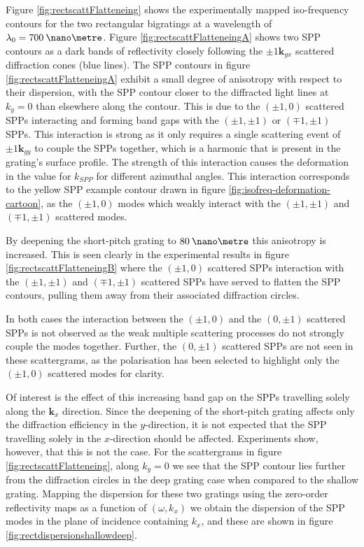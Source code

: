 Figure \ref{fig:rectscattFlatteneing} shows the experimentally mapped iso-frequency contours for the two rectangular bigratings at a wavelength of $\lambda_0=700\:\nano\metre$. Figure \ref{fig:rectscattFlatteneingA} shows two SPP contours as a dark bands of reflectivity closely following the $\pm 1\mathbf{k}_{gx}$ scattered diffraction cones (blue lines). The SPP contours in figure \ref{fig:rectscattFlatteneingA} exhibit a small degree of anisotropy with respect to their dispersion, with the SPP contour closer to the diffracted light lines at $k_y=0$ than elsewhere along the contour. This is due to the $(\pm 1,0)$ scattered SPPs interacting and forming band gaps with the $(\pm 1,\pm 1)$ or $(\mp 1,\pm 1)$ SPPs. This interaction is strong as it only requires a single scattering event of $\pm1\mathbf{k}_{gy}$ to couple the SPPs together, which is a harmonic that is present in the grating's surface profile. The strength of this interaction causes the deformation in the value for $k_{SPP}$ for different azimuthal angles. This interaction corresponds to the yellow SPP example contour drawn in figure \ref{fig:isofreq-deformation-cartoon}, as the $(\pm1,0)$ modes which weakly interact with the $(\pm 1,\pm 1)$ and $(\mp1,\pm1)$ scattered modes. 

By deepening the short-pitch grating to $80\:\nano\metre$ this anisotropy is increased. This is seen clearly in the experimental results in figure \ref{fig:rectscattFlatteneingB} where the $(\pm 1,0)$ scattered SPPs interaction with the $(\pm1,\pm 1)$ and $(\mp 1,\pm 1)$ scattered SPPs have served to flatten the SPP contours, pulling them away from their associated diffraction circles.

In both cases the interaction between the $(\pm 1,0)$ and the $(0,\pm1)$ scattered SPPs is not observed as the weak multiple scattering processes do not strongly couple the modes together. Further, the $(0,\pm 1)$ scattered SPPs are not seen in these scattergrams, as the polarisation has been selected to highlight only the $(\pm 1,0)$ scattered modes for clarity.

Of interest is the effect of this increasing band gap on the SPPs travelling solely along the $\mathbf{k}_x$ direction. Since the deepening of the short-pitch grating affects only the diffraction efficiency in the $y$-direction, it is not expected that the SPP travelling solely in the $x$-direction should be affected. Experiments show, however, that this is not the case. For the scattergrams in figure \ref{fig:rectscattFlatteneing}, along $k_y=0$ we see that the SPP contour lies further from the diffraction circles in the deep grating case when compared to the shallow grating. Mapping the dispersion for these two gratings using the zero-order reflectivity maps as a function of $(\omega,k_x)$ we obtain the dispersion of the SPP modes in the plane of incidence containing $k_x$, and these are shown in figure \ref{fig:rectdispersionshallowdeep}.


